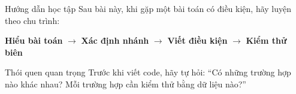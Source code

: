 \documentclass[aspectratio=169,11pt]{beamer}
\newcommand{\key}[1]{\textbf{\textcolor{neublue}{#1}}}
\begin{document}
\begin{frame}{Hướng dẫn học tập}
Sau bài này, khi gặp một bài toán có điều kiện, hãy luyện theo chu trình:
\begin{center}
\Large
\key{Hiểu bài toán} $\rightarrow$ \key{Xác định nhánh} $\rightarrow$ \key{Viết điều kiện} $\rightarrow$ \key{Kiểm thử biên}
\end{center}
\vspace{1em}
\begin{block}{Thói quen quan trọng}
Trước khi viết code, hãy tự hỏi: ``Có những trường hợp nào khác nhau? Mỗi trường hợp cần kiểm thử bằng dữ liệu nào?''
\end{block}
\end{frame}
\end{document}
